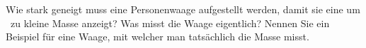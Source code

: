 Wie stark geneigt muss eine Personenwaage aufgestellt werden, damit sie eine um \pReO\ zu kleine Masse anzeigt? Was misst die Waage eigentlich? Nennen Sie ein Beispiel für eine Waage, mit welcher man tatsächlich die Masse misst.
